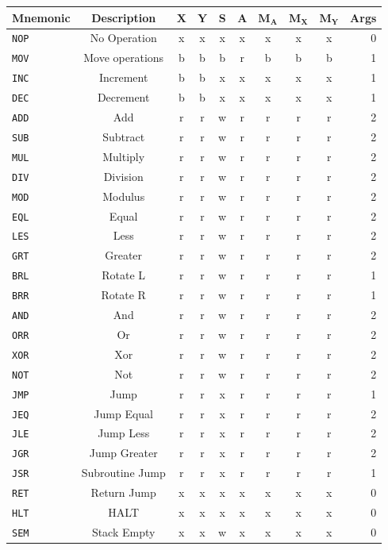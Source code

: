 \documentclass{article}
\newcommand{\x}{$\textbf{X}$}
\newcommand{\y}{$\textbf{Y}$}
\newcommand{\s}{$\textbf{S}$}
\newcommand{\A}{$\textbf{A}$}
\newcommand{\mx}{$\textbf{M}_{\textbf{X}}$}
\newcommand{\my}{$\textbf{M}_{\textbf{Y}}$}
\newcommand{\ma}{$\textbf{M}_{\textbf{A}}$}
\newcommand{\V}{\verb}
\begin{document}
\begin{tabular}{l || c | *{7}{c|} | r}
\textbf{Mnemonic} & \textbf{Description} & \x & \y& \s & \A &\ma & \mx & \my &
Args
\\
\hline
\V+NOP+ & No Operation & x & x & x & x & x & x & x & 0  \\
\hline
\V+MOV+ & Move operations & b & b & b & r & b & b & b & 1 \\
\hline
\V+INC+ & Increment& b & b & x & x & x & x & x & 1 \\
\V+DEC+ & Decrement	& b & b & x & x & x & x & x & 1 \\
\V+ADD+ & Add		& r & r & w & r & r & r & r & 2 \\
\V+SUB+ & Subtract	& r & r & w & r & r & r & r & 2 \\
\V+MUL+ & Multiply	& r & r & w & r & r & r & r & 2 \\
\V+DIV+ & Division	& r & r & w & r & r & r & r & 2 \\
\V+MOD+ & Modulus	& r & r & w & r & r & r & r & 2 \\
\hline
\V+EQL+ & Equal		& r & r & w & r & r & r & r & 2 \\
\V+LES+ & Less		& r & r & w & r & r & r & r & 2 \\
\V+GRT+ & Greater 	& r & r & w & r & r & r & r & 2 \\
\V+BRL+ & Rotate L	& r & r & w & r & r & r & r & 1 \\
\V+BRR+ & Rotate R	& r & r & w & r & r & r & r & 1 \\
\V+AND+ & And		& r & r & w & r & r & r & r & 2 \\
\V+ORR+ & Or 		& r & r & w & r & r & r & r & 2 \\
\V+XOR+ & Xor		& r & r & w & r & r & r & r & 2 \\
\V+NOT+ & Not		& r & r & w & r & r & r & r & 2 \\
\hline
\V+JMP+ & Jump		& r & r & x & r & r & r & r & 1 \\
\V+JEQ+ & Jump Equal& r & r & x & r & r & r & r & 2 \\
\V+JLE+ & Jump Less	& r & r & x & r & r & r & r & 2 \\
\V+JGR+ & Jump Greater& r & r & x & r & r & r & r & 2 \\
\V+JSR+ & Subroutine Jump& r & r & x & r & r & r & r & 1 \\
\V+RET+ & Return Jump& x & x & x & x & x & x & x & 0 \\
\hline
\V+HLT+ & HALT& x & x & x & x & x & x & x & 0 \\
\V+SEM+ & Stack Empty& x & x & w & x & x & x & x & 0 \\
\end{tabular}
\end{document}
